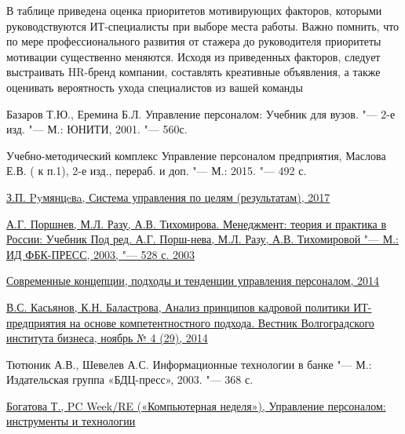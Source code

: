 \documentclass{../industrial-development}
\begin{document}
\lecturenotes

В таблице приведена оценка приоритетов мотивирующих факторов, которыми руководствуются ИТ-специалисты при выборе места работы. Важно помнить, что по мере профессионального развития от стажера до руководителя приоритеты мотивации существенно меняются.
Исходя из приведенных факторов, следует выстраивать HR-бренд компании, составлять креативные объявления, а также оценивать вероятность ухода специалистов из вашей команды~\cite[с.~277]{Pererva}



\begin{thebibliography}{99}

 Базаров Т.Ю., Еремина Б.Л. Управление персоналом: Учебник для вузов. "--- 2-е изд. "--- М.: ЮНИТИ, 2001. "--- 560с.

 Учебно-методический комплекс Управление персоналом предприятия, Маслова Е.В. ( к п.1), 2-е изд., перераб. и доп. "--- М.: 2015. "--- 492 с.
 
 \href{
http://www.elitarium.ru/upravlenie-cel-rezultat-rukovoditel-zadacha-razvitie-plan-process-princip-metod-kontrol-polnomochiya-sistema/}{З.П. Pyмянцeвa, Система управления по целям (результатам), 2017}

 \href{http://scicenter.online/osnovy-menedjmenta-scicenter/upravlenie-posredstvom-motivatsii-41276.html}{
А.Г. Поршнев, М.Л. Разу, А.В. Тихомирова. Менеджмент: теория и практика в России: Учебник Под ред. А.Г. Порш-нева, М.Л. Разу, А.В. Тихомировой "--- М.: ИД ФБК-ПРЕСС, 2003, "--- 528 с. 2003}

 \href{http://www.hr-portal.ru/article/sovremennye-koncepcii-podhody-i-tendencii-upravleniya-personalom}{Современные концепции, подходы и тенденции управления персоналом, 2014}

 \href{http://vestnik.volbi.ru/upload/numbers/429/article-429-962.pdf}{В.С. Касьянов, К.Н. Баластрова, Анализ принципов кадровой политики ИТ-предприятия на основе компетентностного подхода. Вестник Волгоградского института бизнеса, ноябрь № 4 (29), 2014} 

 Тютюник А.В., Шевелев А.С. Информационные технологии в банке "--- М.: Издательская группа «БДЦ-пресс», 2003. "--- 368 с. 

 \href{https://www.itweek.ru/themes/detail.php?ID=73824}{Богатова Т., PC Week/RE («Компьютерная неделя»), Управление персоналом: инструменты и технологии}


\end{thebibliography}
\end{document}
